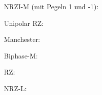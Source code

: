 \documentclass{../exercisesheet}
\begin{document}
\begin{exercise}{5}
	\begin{subexercise}
	NRZI-M (mit Pegeln 1 und -1):
	\begin{figure}[H]
		\centering
	\end{figure}
	Unipolar RZ:
	\begin{figure}[H]
		\centering
	\end{figure}
	Manchester:
	\begin{figure}[H]
		\centering
	\end{figure}
	Biphase-M:
	\begin{figure}[H]
		\centering
	\end{figure}
	RZ:
	\begin{figure}[H]
		\centering
	\end{figure}
	NRZ-L:
	\begin{figure}[H]
		\centering
	\end{figure}\ \\
	\end{subexercise}


\end{exercise}
\end{document}
